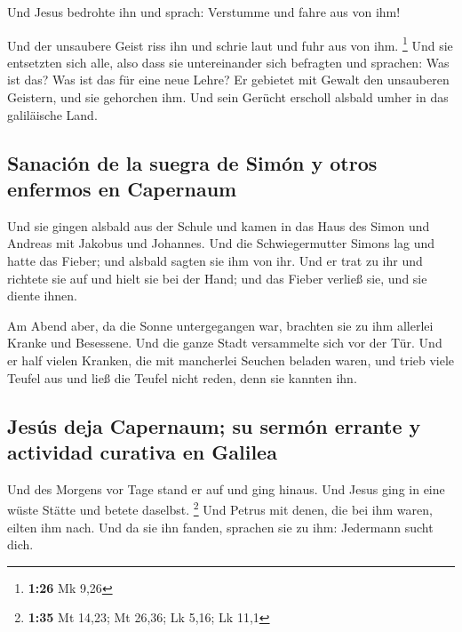  Und Jesus bedrohte ihn und sprach: Verstumme und fahre
aus von ihm!

 Und der unsaubere Geist riss ihn und schrie laut und
fuhr aus von ihm. \footnote{\textbf{1:26} Mk 9,26}  Und
sie entsetzten sich alle, also dass sie untereinander sich befragten und
sprachen: Was ist das? Was ist das für eine neue Lehre? Er gebietet mit
Gewalt den unsauberen Geistern, und sie gehorchen ihm. 
Und sein Gerücht erscholl alsbald umher in das galiläische Land.

\hypertarget{sanaciuxf3n-de-la-suegra-de-simuxf3n-y-otros-enfermos-en-capernaum}{%
\subsection{Sanación de la suegra de Simón y otros enfermos en
Capernaum}\label{sanaciuxf3n-de-la-suegra-de-simuxf3n-y-otros-enfermos-en-capernaum}}

 Und sie gingen alsbald aus der Schule und kamen in das
Haus des Simon und Andreas mit Jakobus und Johannes.  Und
die Schwiegermutter Simons lag und hatte das Fieber; und alsbald sagten
sie ihm von ihr.  Und er trat zu ihr und richtete sie auf
und hielt sie bei der Hand; und das Fieber verließ sie, und sie diente
ihnen.

 Am Abend aber, da die Sonne untergegangen war, brachten
sie zu ihm allerlei Kranke und Besessene.  Und die ganze
Stadt versammelte sich vor der Tür.  Und er half vielen
Kranken, die mit mancherlei Seuchen beladen waren, und trieb viele
Teufel aus und ließ die Teufel nicht reden, denn sie kannten ihn.

\hypertarget{jesuxfas-deja-capernaum-su-sermuxf3n-errante-y-actividad-curativa-en-galilea}{%
\subsection{Jesús deja Capernaum; su sermón errante y actividad curativa
en
Galilea}\label{jesuxfas-deja-capernaum-su-sermuxf3n-errante-y-actividad-curativa-en-galilea}}

 Und des Morgens vor Tage stand er auf und ging hinaus.
Und Jesus ging in eine wüste Stätte und betete daselbst. \footnote{\textbf{1:35}
  Mt 14,23; Mt 26,36; Lk 5,16; Lk 11,1}  Und Petrus mit
denen, die bei ihm waren, eilten ihm nach.  Und da sie
ihn fanden, sprachen sie zu ihm: Jedermann sucht dich.

